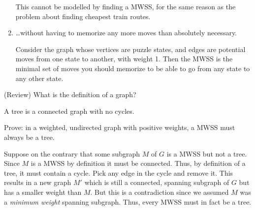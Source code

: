 \documentclass{tufte-handout}
\begin{document}
\begin{questions}
\begin{subquestions}
\begin{enumerate}[label=(\roman*)]
      \begin{answer}
        This cannot be modelled by finding a MWSS, for the same reason
        as the problem about finding cheapest train routes.
      \end{answer}
    \item \dots without having to memorize any more moves than
      absolutely necessary.

      \begin{answer}
        Consider the graph whose vertices are puzzle states, and edges
        are potential moves from one state to another, with weight 1.
        Then the MWSS is the minimal set of moves you should memorize
        to be able to go from any state to any other state.
      \end{answer}
    \end{enumerate}
  \end{subquestions}

\item (Review) What is the definition of a  graph?

  \begin{answer}
    A tree is a connected graph with no cycles.
  \end{answer}
\item \label{q:mwss-tree} Prove: in a weighted, undirected graph with
  positive weights, a MWSS must always be a tree. 

  \begin{answer}
    Suppose on the contrary that some subgraph $M$ of $G$ is a MWSS
    but not a tree.  Since $M$ is a MWSS by definition it must be
    connected.  Thus, by definition of a tree, it must contain a
    cycle.  Pick any edge in the cycle and remove it.  This results in
    a new graph $M'$ which is still a connected, spanning subgraph of
    $G$ but has a smaller weight than $M$.  But this is a
    contradiction since we assumed $M$ was a \emph{minimum weight}
    spanning subgraph.  Thus, every MWSS must in fact be a tree.
  \end{answer}
\end{questions}

\pause
\end{document}
